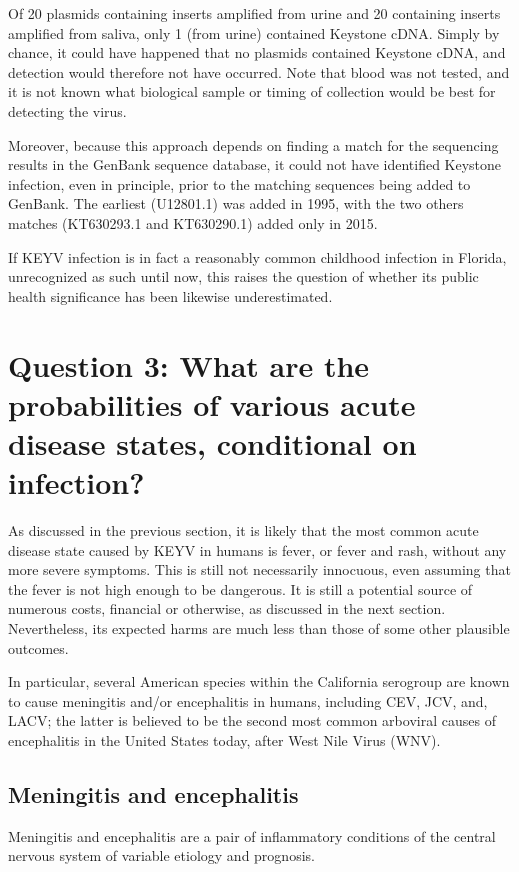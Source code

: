 \documentclass[12pt]{article}
\newcommand{\cjh}{\textcolor{blue}{cjh}}
\newcommand{\msg}[3]{(#1 $\rightarrow$ #2: #3)}
\newcommand{\mcc}[1]{\msg\cjh\cjh{#1}}
\begin{document}
            Of 20 plasmids containing inserts amplified from urine and 20 containing inserts amplified from saliva, only 1 (from urine) contained Keystone cDNA. Simply by chance, it could have happened that no plasmids contained Keystone cDNA, and detection would therefore not have occurred. Note that blood was not tested, and it is not known what biological sample or timing of collection would be best for detecting the virus.
            
            Moreover, because this approach depends on finding a match for the sequencing results in the GenBank sequence database, it could not have identified Keystone infection, even in principle, prior to the matching sequences being added to GenBank.  The earliest (U12801.1) was added in 1995\cite{genbankU12801.1}, with the two others matches (KT630293.1 and KT630290.1) added only in 2015\cite{genbankKT630293.1,genbankKT630290.1}.

            If KEYV infection is in fact a reasonably common childhood infection in Florida, unrecognized as such until now, this raises the question of whether its public health significance has been likewise underestimated.


    \section[Probabilities of disease, given infection]{Question 3: What are the probabilities of various acute disease states, conditional on infection?}
        \label{probabilities}
        As discussed in the previous section, it is likely that the most common acute disease state caused by KEYV in humans is fever, or fever and rash, without any more severe symptoms. This is still not necessarily innocuous, even assuming that the fever is not high enough to be dangerous. It is still a potential source of numerous costs, financial or otherwise, as discussed in the next section. Nevertheless, its expected harms are much less than those of some other plausible outcomes.

        In particular, several American species within the California serogroup are known to cause meningitis and/or encephalitis in humans, including CEV, JCV, and, LACV; the latter is believed to be the second most common arboviral causes of encephalitis in the United States today, after West Nile Virus (WNV).

        \subsection{Meningitis and encephalitis}
            \label{m-and-e}
            Meningitis and encephalitis are a pair of inflammatory conditions of the central nervous system of variable etiology and prognosis.
            
\end{document}
